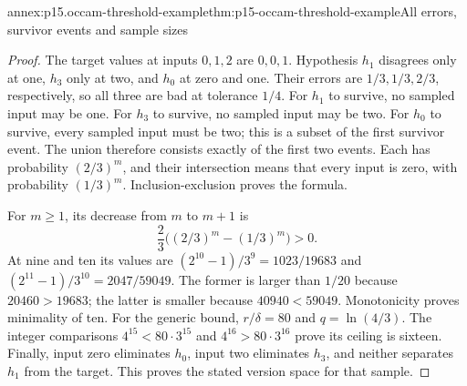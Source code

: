 \begin{annexitem}{annex:p15.occam-threshold-example}{thm:p15-occam-threshold-example}{All errors, survivor events and sample sizes}
\begin{proof}
The target values at inputs \(0,1,2\) are \(0,0,1\).
Hypothesis \(h_1\) disagrees only at one, \(h_3\) only at two,
and \(h_0\) at zero and one. Their errors are \(1/3,1/3,2/3\),
respectively, so all three are bad at tolerance \(1/4\).
For \(h_1\) to survive, no sampled input may be one.
For \(h_3\) to survive, no sampled input may be two.
For \(h_0\) to survive, every sampled input must be two;
this is a subset of the first survivor event.
The union therefore consists exactly of the first two events.
Each has probability \((2/3)^m\), and their intersection
means that every input is zero, with probability \((1/3)^m\).
Inclusion-exclusion proves the formula.

For \(m\geq1\), its decrease from \(m\) to \(m+1\) is
\[
             \frac23\bigl((2/3)^m-(1/3)^m\bigr)>0.
\]
At nine and ten its values are
\((2^{10}-1)/3^9=1023/19683\) and
\((2^{11}-1)/3^{10}=2047/59049\).
The former is larger than \(1/20\) because \(20460>19683\);
the latter is smaller because \(40940<59049\).
Monotonicity proves minimality of ten.
For the generic bound, \(r/\delta=80\) and
\(q=\ln(4/3)\). The integer comparisons
\(4^{15}<80\cdot3^{15}\) and
\(4^{16}>80\cdot3^{16}\) prove its ceiling is sixteen.
Finally, input zero eliminates \(h_0\), input two eliminates
\(h_3\), and neither separates \(h_1\) from the target.
This proves the stated version space for that sample.
\end{proof}
\end{annexitem}

